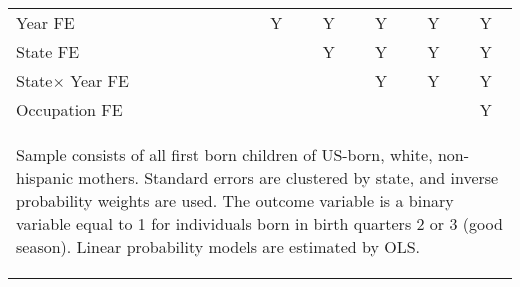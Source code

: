 \begin{table}[htbp]
{\begin{tabular}{l*{6}{c}}
\midrule Year FE&&Y&Y&Y&Y&Y\\ State FE&&&Y&Y&Y&Y\\
State$\times$ Year FE&&&&Y&Y&Y\\ Occupation FE &&&&&&Y\\ \bottomrule
\multicolumn{7}{p{13.9cm}}{\begin{footnotesize}Sample consists of all
first born children of US-born, white, non-hispanic mothers.
Standard errors are clustered by state, and inverse probability
weights are used.  The outcome variable is a binary variable
equal to 1 for individuals born in birth quarters 2 or 3 (good
season). Linear probability models are estimated by OLS.
\end{footnotesize}}\end{tabular}}\end{table}
